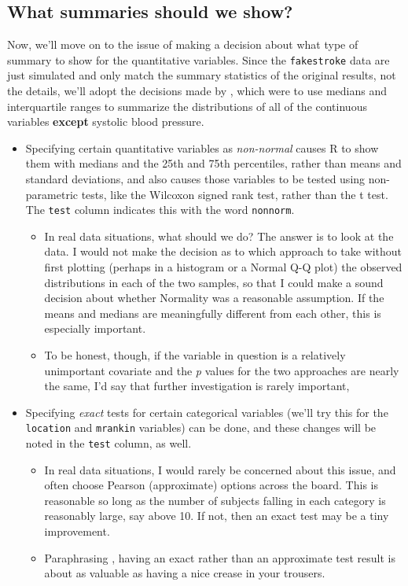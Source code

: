 \documentclass[]{book}
\providecommand{\tightlist}{%
  \setlength{\itemsep}{0pt}\setlength{\parskip}{0pt}}
\theoremstyle{definition}
\theoremstyle{definition}
\theoremstyle{definition}
\theoremstyle{remark}
\begin{document}
\subsection{What summaries should we
show?}\label{what-summaries-should-we-show}

Now, we'll move on to the issue of making a decision about what type of
summary to show for the quantitative variables. Since the
\texttt{fakestroke} data are just simulated and only match the summary
statistics of the original results, not the details, we'll adopt the
decisions made by \citet{Berkhemer2015}, which were to use medians and
interquartile ranges to summarize the distributions of all of the
continuous variables \textbf{except} systolic blood pressure.

\begin{itemize}
\tightlist
\item
  Specifying certain quantitative variables as \emph{non-normal} causes
  R to show them with medians and the 25th and 75th percentiles, rather
  than means and standard deviations, and also causes those variables to
  be tested using non-parametric tests, like the Wilcoxon signed rank
  test, rather than the t test. The \texttt{test} column indicates this
  with the word \texttt{nonnorm}.

  \begin{itemize}
  \tightlist
  \item
    In real data situations, what should we do? The answer is to look at
    the data. I would not make the decision as to which approach to take
    without first plotting (perhaps in a histogram or a Normal Q-Q plot)
    the observed distributions in each of the two samples, so that I
    could make a sound decision about whether Normality was a reasonable
    assumption. If the means and medians are meaningfully different from
    each other, this is especially important.
  \item
    To be honest, though, if the variable in question is a relatively
    unimportant covariate and the \emph{p} values for the two approaches
    are nearly the same, I'd say that further investigation is rarely
    important,
  \end{itemize}
\item
  Specifying \emph{exact} tests for certain categorical variables (we'll
  try this for the \texttt{location} and \texttt{mrankin} variables) can
  be done, and these changes will be noted in the \texttt{test} column,
  as well.

  \begin{itemize}
  \tightlist
  \item
    In real data situations, I would rarely be concerned about this
    issue, and often choose Pearson (approximate) options across the
    board. This is reasonable so long as the number of subjects falling
    in each category is reasonably large, say above 10. If not, then an
    exact test may be a tiny improvement.
  \item
    Paraphrasing \citet{Rosenbaum2017}, having an exact rather than an
    approximate test result is about as valuable as having a nice crease
    in your trousers.
  \end{itemize}
\end{itemize}
\end{document}
